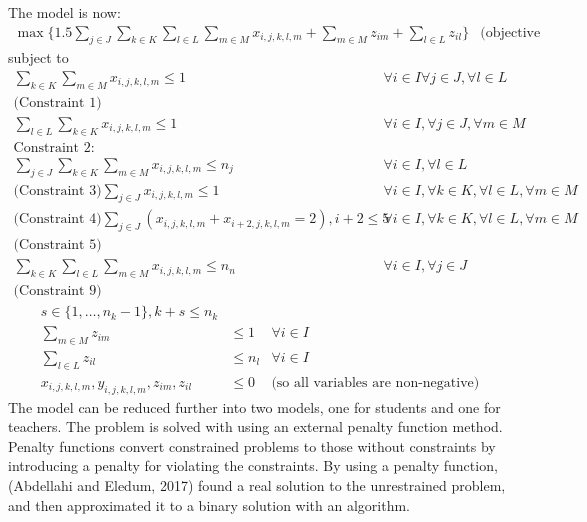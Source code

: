 \documentclass[a4paper, 12pt]{report}
\begin{document}
The model is now:
\begin{align*}
	\max \{1.5 \sum_{j \in J} \sum_{k \in K} \sum_{l \in L} \sum_{m \in M}
	x_{i,j,k,l,m} + \sum_{m \in M} z_{im} + \sum_{l \in L}z_{il} \}
	& \text{(objective function)}
\end{align*}
subject to
\begin{align*}
	\sum_{k \in K} \sum_{m \in M} x_{i,j,k,l,m} \leq 1
		& \forall i \in I \forall j \in J, \forall l \in L \\
	\text{(Constraint 1)} \\
	\sum_{l \in L} \sum_{k \in K} x_{i,j,k,l,m} \leq 1 
		& \forall i \in I, \forall j \in J, \forall m \in M \\
	\text{Constraint 2: } \\
	\sum_{j \in J} \sum_{k \in K} \sum_{m \in M} x_{i,j,k,l,m} \leq n_j
		& \forall i \in I, \forall l \in L \\
	\text{(Constraint 3)}
	\sum_{j \in J}x_{i,j,k,l,m} \leq 1
		& \forall i \in I, \forall k \in K, \forall l \in L, \forall m \in M \\
	\text{(Constraint 4)}
	\sum_{j \in J}(x_{i,j,k,l,m} + x_{i+2,j,k,l,m} = 2), i + 2 \leq 5
		& \forall i \in I, \forall k \in K, \forall l \in L, \forall m \in M \\
	\text{(Constraint 5)} \\
	\sum_{k \in K} \sum_{l \in L} \sum_{m \in M} x_{i,j,k,l,m} \leq n_n
		& \forall i \in I, \forall j \in J \\
	\text{(Constraint 9)}
\end{align*}
\begin{align*}
	s \in \{1, \ldots, n_k - 1\}, k + s \leq n_k \\
	\sum_{m \in M}z_{im}
		& \leq 1
		& \forall i \in I \\
	\sum_{l \in L} z_{il}
		&\leq n_l
		& \forall i \in I \\
	x_{i,j,k,l,m}, y_{i,j,k,l,m}, z_{im}, z_{il}
		&\leq 0
		& \text{(so all variables are non-negative)}
\end{align*}
The model can be reduced further into two models, one for students and one for
teachers.
The problem is solved with using an external penalty function method. Penalty
functions convert constrained problems to those without constraints by
introducing a penalty for violating the constraints.
By using a penalty function, (Abdellahi and Eledum, 2017) found a real solution
to the unrestrained problem, and then approximated it to a binary solution with
an algorithm.
\end{document}
